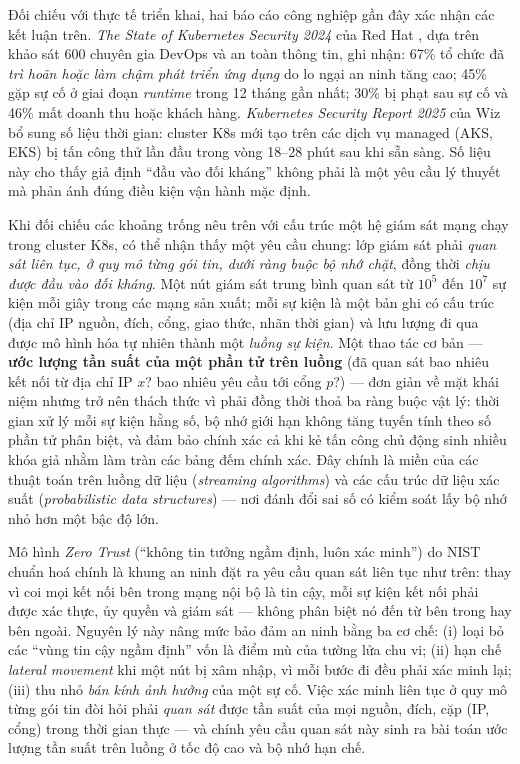 Đối chiếu với thực tế triển khai, hai báo cáo công nghiệp gần đây xác nhận các kết luận trên. \textit{The State of Kubernetes Security 2024} của Red Hat \cite{redhat2024k8ssec}, dựa trên khảo sát 600 chuyên gia DevOps và an toàn thông tin, ghi nhận: 67\% tổ chức đã \textit{trì hoãn hoặc làm chậm phát triển ứng dụng} do lo ngại an ninh tăng cao; 45\% gặp sự cố ở giai đoạn \textit{runtime} trong 12 tháng gần nhất; 30\% bị phạt sau sự cố và 46\% mất doanh thu hoặc khách hàng. \textit{Kubernetes Security Report 2025} của Wiz \cite{wiz2025k8ssec} bổ sung số liệu thời gian: cluster K8s mới tạo trên các dịch vụ managed (AKS, EKS) bị tấn công thử lần đầu trong vòng 18--28 phút sau khi sẵn sàng. Số liệu này cho thấy giả định ``đầu vào đối kháng'' không phải là một yêu cầu lý thuyết mà phản ánh đúng điều kiện vận hành mặc định.

Khi đối chiếu các khoảng trống nêu trên với cấu trúc một hệ giám sát mạng chạy trong cluster K8s, có thể nhận thấy một yêu cầu chung: lớp giám sát phải \textit{quan sát liên tục, ở quy mô từng gói tin, dưới ràng buộc bộ nhớ chặt}, đồng thời \textit{chịu được đầu vào đối kháng}. Một nút giám sát trung bình quan sát từ $10^5$ đến $10^7$ sự kiện mỗi giây trong các mạng sản xuất; mỗi sự kiện là một bản ghi có cấu trúc (địa chỉ IP nguồn, đích, cổng, giao thức, nhãn thời gian) và lưu lượng đi qua được mô hình hóa tự nhiên thành một \textit{luồng sự kiện}. Một thao tác cơ bản --- \textbf{ước lượng tần suất của một phần tử trên luồng} (đã quan sát bao nhiêu kết nối từ địa chỉ IP $x$? bao nhiêu yêu cầu tới cổng $p$?) --- đơn giản về mặt khái niệm nhưng trở nên thách thức vì phải đồng thời thoả ba ràng buộc vật lý: thời gian xử lý mỗi sự kiện hằng số, bộ nhớ giới hạn không tăng tuyến tính theo số phần tử phân biệt, và đảm bảo chính xác cả khi kẻ tấn công chủ động sinh nhiều khóa giả nhằm làm tràn các bảng đếm chính xác. Đây chính là miền của các thuật toán trên luồng dữ liệu (\textit{streaming algorithms}) và các cấu trúc dữ liệu xác suất (\textit{probabilistic data structures}) --- nơi đánh đổi sai số có kiểm soát lấy bộ nhớ nhỏ hơn một bậc độ lớn.

Mô hình \textit{Zero Trust} (``không tin tưởng ngầm định, luôn xác minh'') do NIST chuẩn hoá \cite{nist800207} chính là khung an ninh đặt ra yêu cầu quan sát liên tục như trên: thay vì coi mọi kết nối bên trong mạng nội bộ là tin cậy, mỗi sự kiện kết nối phải được xác thực, ủy quyền và giám sát --- không phân biệt nó đến từ bên trong hay bên ngoài. Nguyên lý này nâng mức bảo đảm an ninh bằng ba cơ chế: (i) loại bỏ các ``vùng tin cậy ngầm định'' vốn là điểm mù của tường lửa chu vi; (ii) hạn chế \textit{lateral movement} khi một nút bị xâm nhập, vì mỗi bước đi đều phải xác minh lại; (iii) thu nhỏ \textit{bán kính ảnh hưởng} của một sự cố. Việc xác minh liên tục ở quy mô từng gói tin đòi hỏi phải \textit{quan sát} được tần suất của mọi nguồn, đích, cặp (IP, cổng) trong thời gian thực --- và chính yêu cầu quan sát này sinh ra bài toán ước lượng tần suất trên luồng ở tốc độ cao và bộ nhớ hạn chế.

